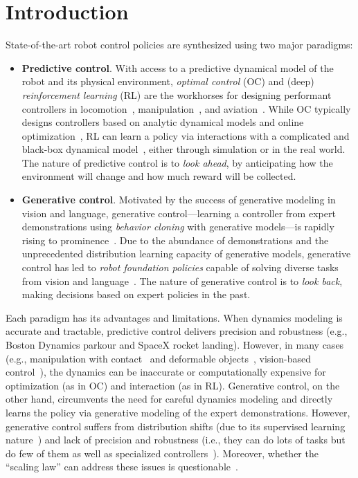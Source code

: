 
\vspace{-4mm}
\section{Introduction}
\label{sec:introduction}

State-of-the-art robot control policies are synthesized using two major paradigms:
\begin{itemize}
    \item \textbf{Predictive control}. With access to a predictive dynamical model of the robot and its physical environment, \emph{optimal control} (OC) and (deep) \emph{reinforcement learning} (RL) are the workhorses for designing performant controllers in locomotion~\cite{wensing2023optimization}, manipulation~\cite{akkaya2019solving}, and aviation~\cite{acikmese2007convex,kaufmann2020deep}. While OC typically designs controllers based on analytic dynamical models and online optimization~\cite{kang2024fast}, RL can learn a policy via interactions with a complicated and black-box dynamical model~\cite{rudin2022learning}, either through simulation or in the real world. The nature of predictive control is to \emph{look ahead}, by anticipating how the environment will change and how much reward will be collected.
    \item \textbf{Generative control}. Motivated by the success of generative modeling in vision and language, generative control---learning a controller from expert demonstrations using \emph{behavior cloning} with generative models---is rapidly rising to prominence~\cite{chi2023diffusion,urain2024deep}. Due to the abundance of demonstrations and the unprecedented distribution learning capacity of generative models, generative control has led to \emph{robot foundation policies} capable of solving diverse tasks from vision and language~\cite{firoozi2023foundation}. The nature of generative control is to \emph{look back}, making decisions based on expert policies in the past.
\end{itemize}

Each paradigm has its advantages and limitations. When dynamics modeling is accurate and tractable, predictive control delivers precision and robustness (e.g., Boston Dynamics parkour and SpaceX rocket landing). However, in many cases (e.g., manipulation with contact~\cite{le2024contact} and deformable objects~\cite{zhu2022challenges}, vision-based control~\cite{qi2024control}), the dynamics can be inaccurate or computationally expensive for optimization (as in OC) and interaction (as in RL). Generative control, on the other hand, circumvents the need for careful dynamics modeling and directly learns the policy via generative modeling of the expert demonstrations. However, generative control suffers from distribution shifts (due to its supervised learning nature~\cite{li2024evaluating,firoozi2023foundation}) and lack of precision and robustness (i.e., they can do lots of tasks but do few of them as well as specialized controllers~\cite{du2024learning,black2023zero}). Moreover, whether the ``scaling law'' can address these issues is questionable~\cite{ankile2024imitation,zhao2024aloha,yu2024lucidsim}.

